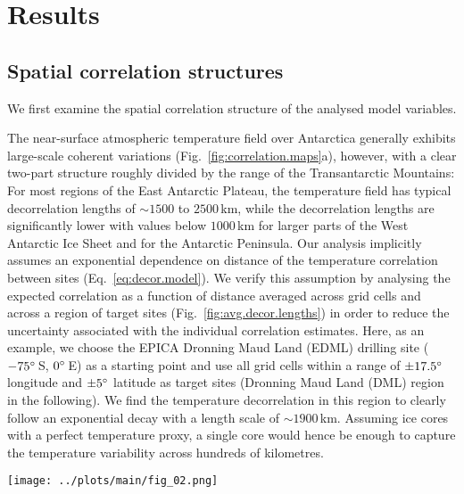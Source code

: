\documentclass[cp, manuscript]{copernicus}
\begin{document}
\section{Results}\label{results}

\subsection{Spatial correlation structures}\label{results:cor.struct}

We first examine the spatial correlation structure of the analysed model
variables.

The near-surface atmospheric temperature field over Antarctica generally
exhibits large-scale coherent variations (Fig.~\ref{fig:correlation.maps}a),
however, with a clear two-part structure roughly divided by the range of the
Transantarctic Mountains: For most regions of the East Antarctic Plateau, the
temperature field has typical decorrelation lengths of $\sim1500$ to $2500$\,km,
while the decorrelation lengths are significantly lower with values below
$1000$\,km for larger parts of the West Antarctic Ice Sheet and for the
Antarctic Peninsula. Our analysis implicitly assumes an exponential dependence
on distance of the temperature correlation between sites
(Eq.~\ref{eq:decor.model}). We verify this assumption by analysing the expected
correlation as a function of distance averaged across grid cells and across a
region of target sites (Fig.~\ref{fig:avg.decor.lengths}) in order to reduce the
uncertainty associated with the individual correlation estimates. Here, as an
example, we choose the EPICA Dronning Maud Land (EDML) drilling site
($-75^{\circ}$\,S, $0^{\circ}$\,E) as a starting point and use all grid cells
within a range of $\pm17.5^{\circ}$ longitude and $\pm5^{\circ}$ latitude as
target sites (Dronning Maud Land (DML) region in the following). We find the
temperature decorrelation in this region to clearly follow an exponential decay
with a length scale of $\sim1900$\,km. Assuming ice cores with a perfect
temperature proxy, a single core would hence be enough to capture the
temperature variability across hundreds of kilometres.

\begin{figure*}[t]%
\centering
\texttt{[image: ../plots/main/fig\_02.png]}
\caption{%
  Temperature decorrelation lengths and temperature--isotope
  relationship. (\textbf{a}) The temperature decorrelation lengths ($\tau$, in
  km) for each Antarctic model grid cell estimated by fitting an exponential
  model to the correlation--distance relationship obtained from correlating the
  local near-surface $T_{2\mathrm{m}}$ time series with the temperature time
  series from all other grid cells (Eq.~\ref{eq:decor.model}). Note that only
  continental grid cells are used for the fit. (\textbf{b}) The local
  correlation between the interannual near-surface temperature
  ($T_{2\mathrm{m}}$) and precipitation-weighted oxygen isotope composition
  ($\delta^{18}\mathrm{O}^{\mathrm{(pw)}}$) time series for each Antarctic model
  grid cell.}
\label{fig:correlation.maps}%
\end{figure*}%
\end{document}
